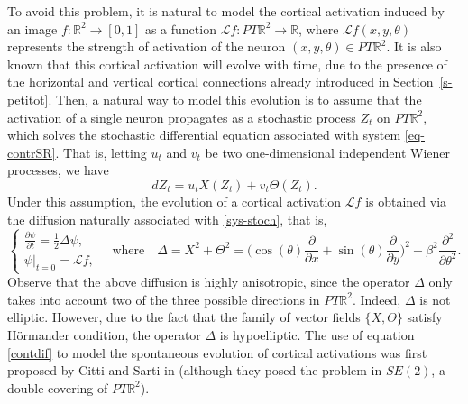 \documentclass[proc]{edpsmath}
\newcommand{\R}{\mathbb{R}}
\begin{document}
To avoid this problem, it is natural to model the cortical activation induced by an image $f:\mathbb R^2\to [0,1]$ as a function $\mathcal Lf:PT\mathbb R^2\to \mathbb R$, where $\mathcal Lf(x,y,\theta)$ represents the strength of activation of the neuron $(x,y,\theta)\in PT\mathbb R^2$.
It is also known  that this cortical activation will evolve with time, due to the presence of the horizontal and vertical cortical connections already introduced in Section~\ref{s-petitot}. Then, a natural way to model this evolution is to assume that the activation of a single neuron propagates as a stochastic process $Z_t$ on $PT\mathbb R^2$, which solves the stochastic differential equation associated with system \eqref{eq-contrSR}. That is, letting $u_t$ and $v_t$ be two one-dimensional independent Wiener processes, we have
\begin{equation}\label{sys-stoch}
  d Z_t = u_t X(Z_t) + v_t \Theta(Z_t).
\end{equation}
Under this assumption, the evolution of a cortical activation $\mathcal Lf$ is obtained via the diffusion naturally associated with \eqref{sys-stoch}, that is,
\begin{equation}
\begin{cases}
\displaystyle\frac{\partial \psi}{\partial t}= \frac{1}{2}\Delta \psi, \\[.75em]
\psi|_{t=0} = \mathcal L f,
\end{cases}
\quad\text{where}\quad
\Delta = X^2 + \Theta^2 = \biggl(\cos(\theta)\frac{\partial}{\partial x}+
\sin(\theta)\frac{\partial}{\partial y}\biggr)^{2} +
\beta^2\frac{\partial^{2}}{\partial\theta^{2}}. \label{contdif}
\end{equation}
Observe that the above diffusion is highly anisotropic, since the operator $\Delta$ only takes into account two of the three possible directions in $PT\mathbb R^2$. Indeed, $\Delta$ is not elliptic. However, due to the fact that the family of vector fields $\{X,\Theta\}$ satisfy H\"ormander condition, the operator $\Delta$ is hypoelliptic.
The use of equation \eqref{contdif} to model the spontaneous evolution of cortical activations was first proposed by Citti and Sarti in \cite{citti-sarti} (although they posed the problem in $SE(2)$, a double covering of $PT\R^2$).
\end{document}
